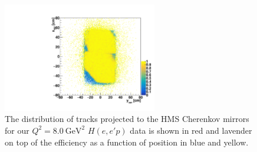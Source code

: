 \begin{figure}[!h]
    \centering
    \includegraphics[width=0.6\textwidth]{chap4/plot_scripts/hCer_eff_short_pal.pdf}
    \caption{
            The distribution of tracks projected to the HMS Cherenkov mirrors
            for our $Q^2=\SI{8.0}{\giga\electronvolt\squared}$ $H(e,e'p)$
            data is shown in red and lavender
            on top of the
            efficiency as a function of position in blue and yellow.
            }
    \label{fig:hms_mirror_lh2_tracks}
\end{figure}


